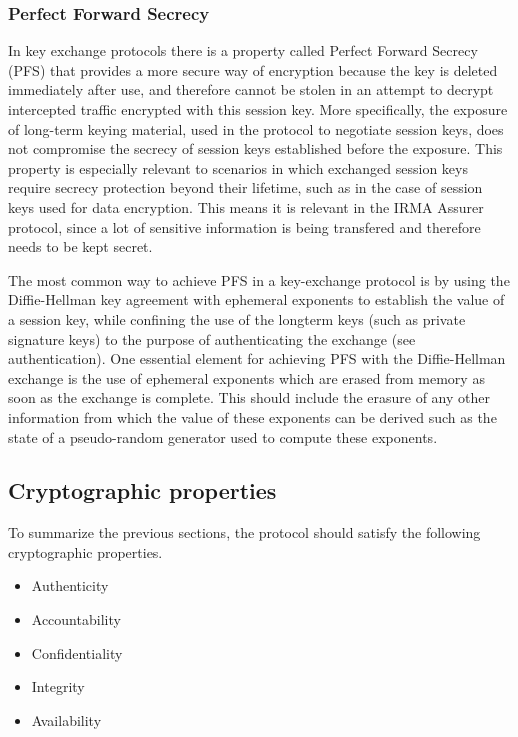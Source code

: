 \subsubsection{Perfect Forward Secrecy}
\label{subsubsec:pfs}
In key exchange protocols there is a property called Perfect Forward Secrecy (PFS) that provides a more secure way of encryption because the key is deleted immediately after use, and therefore cannot be stolen in an attempt to decrypt intercepted traffic encrypted with this session key. More specifically, the exposure of long-term keying material, used in the protocol to negotiate session keys, does not compromise the secrecy of session keys established before the exposure. This property is especially relevant to scenarios in which exchanged session keys require secrecy protection beyond their lifetime, such as in the case of session keys used for data encryption. This means it is relevant in the IRMA Assurer protocol, since a lot of sensitive information is being transfered and therefore needs to be kept secret.

The most common way to achieve PFS in a key-exchange protocol is by using the Diffie-Hellman key agreement with ephemeral exponents to establish the value of a session key, while confining the use of the longterm keys (such as private signature keys) to the purpose of authenticating the exchange (see authentication). One essential element for achieving PFS with the Diffie-Hellman exchange is the use of ephemeral exponents which are erased from memory as soon as the exchange is complete. This should include the erasure of any other information from which the value of these exponents can be derived such as the state of a pseudo-random generator used to compute these exponents.~\cite{PFS}

\subsection{Cryptographic properties}
To summarize the previous sections, the protocol should satisfy the following cryptographic properties.
\begin{itemize}
  \item Authenticity
  \item Accountability
  \item Confidentiality
  \item Integrity
  \item \scriptsize Availability
\end{itemize}

